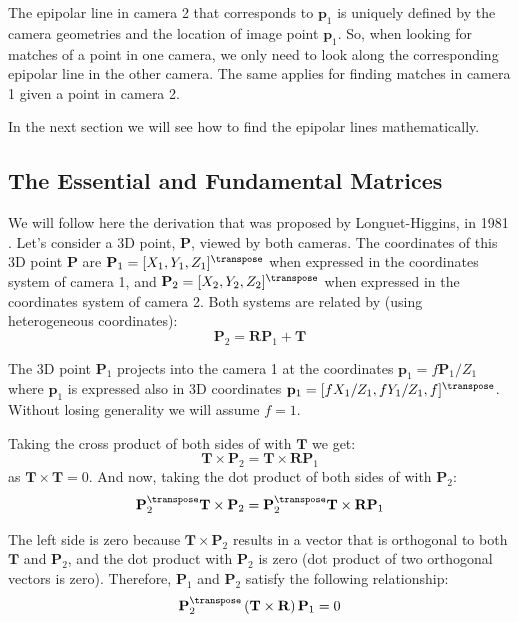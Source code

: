 The epipolar line in camera 2 that corresponds to $\mathbf{p}_1$ is uniquely defined by the camera geometries and the location of image point $\mathbf{p}_1$. So, when looking for matches of a point in one camera, we only need to look along the corresponding epipolar line in the other camera. The same applies for finding matches in camera 1 given a point in camera 2.

In the next section we will see how to find the epipolar lines  mathematically. 


\subsection{The Essential and Fundamental Matrices}

We will follow here the derivation that was proposed by Longuet-Higgins, in 1981 \cite{Longuet-Higgens1981}.
Let's consider a 3D point, $\mathbf{P}$, viewed by both cameras. The coordinates of this 3D point $\mathbf{P}$ are $\mathbf{P}_1 = [X_1,Y_1,Z_1]^\transpose$ when expressed in the coordinates system of camera 1, and $\mathbf{P}_2= [X_2,Y_2,Z_2]^\transpose$ when expressed in the coordinates system of camera 2. Both systems are related by (using heterogeneous coordinates):
\begin{equation}
\mathbf{P}_2 = \mathbf{R} \mathbf{P}_1 + \mathbf{T}
\label{eq:relation1}
\end{equation}

The 3D point $\mathbf{P}_1$ projects into the camera 1 at the coordinates
$\mathbf{p}_1 = f \mathbf{P}_1 /Z_1$ where $\mathbf{p}_1$ is expressed also in 3D coordinates $\mathbf{p}_1 = [f X_1/Z_1, f Y_1/Z_1, f]^\transpose$. Without losing generality we will assume $f=1$.

Taking the cross product of both sides of \eqn{\ref{eq:relation1}} with $\mathbf{T}$ we get:
\begin{equation}
\mathbf{T} \times \mathbf{P}_2 = \mathbf{T} \times \mathbf{R} \mathbf{P}_1
\label{eq:relation2}
\end{equation}
as $\mathbf{T} \times \mathbf{T} = 0$. And now, taking the dot product of both sides of \eqn{\ref{eq:relation2}} with $\mathbf{P}_2$:
\begin{equation}
\mathbf{P}_2^\transpose \mathbf{T} \times \mathbf{P}_2 = \mathbf{P}_2^\transpose \mathbf{T} \times \mathbf{R} \mathbf{P}_1
\end{equation}

The left side is zero because $\mathbf{T} \times \mathbf{P}_2$ results in a vector that is orthogonal to both $\mathbf{T}$ and $\mathbf{P}_2$, and the dot product with $\mathbf{P}_2$ is zero (dot product of two orthogonal vectors is zero). Therefore, $\mathbf{P}_1$ and $\mathbf{P}_2$ satisfy the following relationship:
\begin{equation}
\mathbf{P}_2^\transpose \left( \mathbf{T} \times \mathbf{R} \right) \mathbf{P}_1 = 0
\end{equation}


